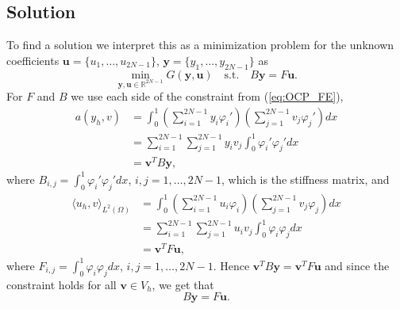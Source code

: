 \subsection{Solution}
To find a solution we interpret this as a minimization problem for the unknown coefficients $\mathbf{u} = \{u_1, \dots, u_{2N-1} \}$, $\mathbf{y} = \{y_1, \dots, y_{2N-1} \}$ as
\begin{equation}
    \label{eq:OCP_coeff}
    \min_{\mathbf{y,u} \in \mathds{R}^{2N-1}} G(\mathbf{y, u}) \quad \text{s.t.} \quad B\mathbf{y} = F\mathbf{u}.
\end{equation}
For $F$ and $B$ we use each side of the constraint from (\ref{eq:OCP_FE}), 
\begin{align*}
    a(y_h, v) &= \int_0^1 \left( \sum_{i=1}^{2N-1} y_i \varphi_i'  \right) \left( \sum_{j=1}^{2N-1} v_j \varphi_j'\right)dx  \\
    & = \sum_{i=1}^{2N-1}\sum_{j=1}^{2N-1} y_i v_j\int_0^1  \varphi_i' \varphi_j' dx \\
    &= \mathbf{v}^T B \mathbf{y} ,
\end{align*}
where $B_{i,j} = \int_0^1 \varphi_i' \varphi_j'dx$,  $i,j = 1, \dots, 2N-1$, which is the stiffness matrix, and  
\begin{align*}
    \langle u_h, v \rangle_{L^2(\Omega)} &= \int_0^1 \left( \sum_{i=1}^{2N-1} u_i \varphi_i \right) \left( \sum_{j=1}^{2N-1} v_j \varphi_j \right) dx \\
    &= \sum_{i=1}^{2N-1}\sum_{j=1}^{2N-1} u_i v_j\int_0^1  \varphi_i \varphi_j dx \\
    &= \mathbf{v}^T F \mathbf{u} , 
\end{align*}
 where $F_{i,j}=\int_0^1  \varphi_i \varphi_j dx$, $i,j = 1, \dots, 2N-1$.
Hence \( \mathbf{v}^T B \mathbf{y} = \mathbf{v}^T F \mathbf{u}  \) and
since the constraint holds for all $\mathbf{v} \in V_h$, we get that
$$B\mathbf{y} = F \mathbf{u}.$$

